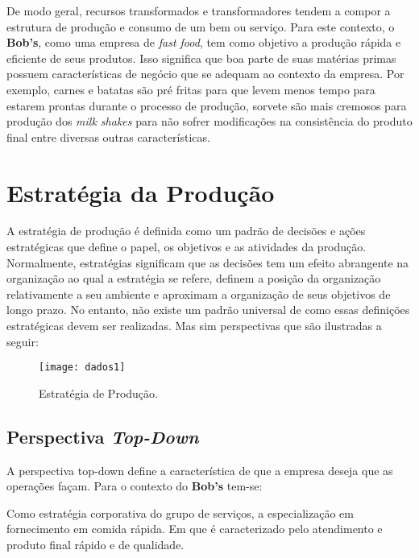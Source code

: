 		De modo geral, recursos transformados e transformadores tendem a compor a estrutura de produção e consumo de um bem ou serviço. Para este contexto, o \textbf{Bob’s}, como uma empresa de \emph{fast food}, tem como objetivo a produção rápida e eficiente de seus produtos. Isso significa que boa parte de suas matérias primas possuem características de negócio que se adequam ao contexto da empresa. Por exemplo, carnes e batatas são pré fritas para que levem menos tempo para estarem prontas durante o processo de produção, sorvete são mais cremosos para produção dos \emph{milk shakes} para não sofrer modificações na consistência do produto final entre diversas outras características.

	\section[Estratégia da Produção]{Estratégia da Produção}
	\label{sec:dados_estrategia}

		A estratégia de produção é definida como um padrão de decisões e ações estratégicas que define o papel, os objetivos e as atividades da produção. Normalmente, estratégias significam que as decisões tem um efeito abrangente na organização ao qual a estratégia se refere, definem a posição da organização relativamente a seu ambiente e aproximam a organização de seus objetivos de longo prazo. No entanto, não existe um padrão universal de como essas definições estratégicas devem ser realizadas. Mas sim perspectivas que são ilustradas a seguir:

		\begin{figure}[h]
			\centering
			\texttt{[image: dados1]}
			\caption[Estratégia de Produção]{Estratégia de Produção. \cite{slack}}
			\label{fig:dados1}
		\end{figure}

		\subsection[Perspectiva Top-Down]{Perspectiva \emph{Top-Down}}
		\label{sec:dados_perspNorte}

			A perspectiva top-down define a característica de que a empresa deseja que as operações façam. Para o contexto do \textbf{Bob’s} tem-se:

			Como estratégia corporativa do grupo de serviços, a especialização em fornecimento em comida rápida. Em que é caracterizado pelo atendimento e produto final rápido e de qualidade.

